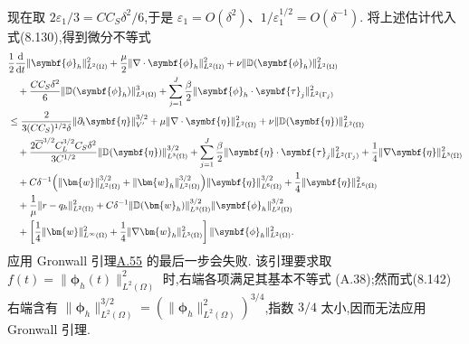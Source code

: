 \begin{note}[自然正则性下且 $\nu_0(\delta)=0$ 的情形]
现在取 $2\varepsilon_1/3=CC_S\delta^2/6$,于是
$\varepsilon_1=O(\delta^2)$、$1/\varepsilon_1^{1/2}=O(\delta^{-1})$.
将上述估计代入式(8.130),得到微分不等式
\begin{equation}\label{eq:smagorinsky-error-differential-zero-viscosity}
\begin{aligned}
&\frac12\frac{\mathrm{d}}{\mathrm{d}t}
 \|\symbf{\phi}_h\|_{L^2(\Omega)}^2
 +\frac\mu2\|\nabla\cdot\symbf{\phi}_h\|_{L^2(\Omega)}^2
 +\nu\|\mathbb{D}(\symbf{\phi}_h)\|_{L^2(\Omega)}^2\\
&\quad+\frac{CC_S\delta^2}{6}
 \|\mathbb{D}(\symbf{\phi}_h)\|_{L^3(\Omega)}^3
 +\sum_{j=1}^J\frac\beta2
 \|\symbf{\phi}_h\cdot\symbf{\tau}_j\|_{L^2(\Gamma_j)}^2\\
&\le\frac{2}{3(CC_S)^{1/2}\delta}
 \|\partial_t\symbf{\eta}\|_{V'}^{3/2}
 +\mu\|\nabla\cdot\symbf{\eta}\|_{L^2(\Omega)}^2
 +\nu\|\mathbb{D}(\symbf{\eta})\|_{L^2(\Omega)}^2\\
&\quad+\frac{2\overline C^{3/2}C_L^{3/2}C_S\delta^2}{3C^{1/2}}
 \|\mathbb{D}(\symbf{\eta})\|_{L^3(\Omega)}^{3/2}
 +\sum_{j=1}^J\frac\beta2
 \|\symbf{\eta}\cdot\symbf{\tau}_j\|_{L^2(\Gamma_j)}^2
 +\frac14\|\nabla\symbf{\eta}\|_{L^3(\Omega)}^2\\
&\quad+C\delta^{-1}
 \Bigl(\|\bm{w}\|_{L^2(\Omega)}^{3/2}
       +\|\bm{w}_h\|_{L^2(\Omega)}^{3/2}\Bigr)
 \|\symbf{\eta}\|_{L^6(\Omega)}^{3/2}
 +\frac14\|\symbf{\eta}\|_{L^6(\Omega)}^2\\
&\quad+\frac1\mu\|r-q_h\|_{L^2(\Omega)}^2
 +C\delta^{-1}
 \|\mathbb{D}(\bm{w}_h)\|_{L^3(\Omega)}^{3/2}
 \|\symbf{\phi}_h\|_{L^2(\Omega)}^{3/2}\\
&\quad+\left[
 \frac14\|\bm{w}\|_{L^\infty(\Omega)}^2
 +\frac14\|\nabla\bm{w}_h\|_{L^3(\Omega)}^2
 \right]\|\symbf{\phi}_h\|_{L^2(\Omega)}^2.
\end{aligned}
\end{equation}
应用 Gronwall 引理\hyperref[lem:appendix-a-55]{A.55} 的最后一步会失败.
该引理要求取 $f(t)=\|\symbf{\phi}_h(t)\|_{L^2(\Omega)}^2$ 时,右端各项满足其基本不等式
(A.38);然而式(8.142)右端含有
$\|\symbf{\phi}_h\|_{L^2(\Omega)}^{3/2}
=(\|\symbf{\phi}_h\|_{L^2(\Omega)}^2)^{3/4}$,指数 $3/4$ 太小,因而无法应用 Gronwall 引理.


\end{note}
